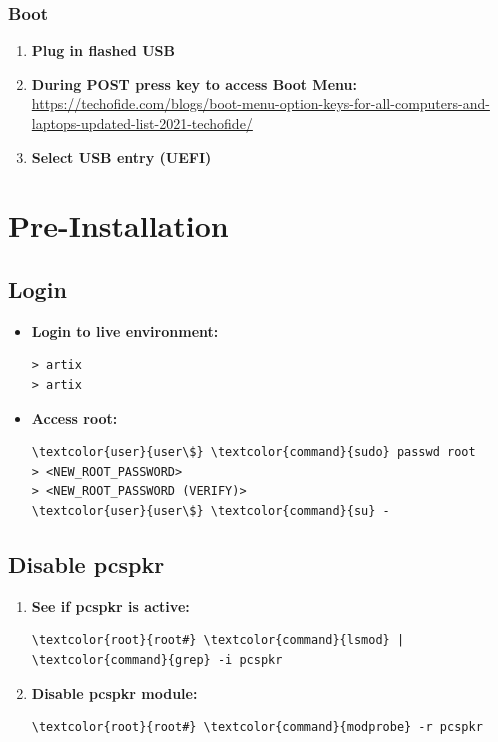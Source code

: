 \documentclass[10pt, a4paper, onecolumn, oneside, titlepage, openany]{book}
\begin{document}
\subsection{Boot}
\begin{enumerate}
    \item \textbf{Plug in flashed USB}
    \item \textbf{During POST press key to access Boot Menu:}
\newline \href{https://techofide.com/blogs/boot-menu-option-keys-for-all-computers-and-laptops-updated-list-2021-techofide/}{https://techofide.com/blogs/boot-menu-option-keys-for-all-computers-and-laptops-updated-list-2021-techofide/}
    \item \textbf{Select USB entry (UEFI)}
\end{enumerate}


\chapter{Pre-Installation}
\section{Login}
\begin{itemize}
    \item \textbf{Login to live environment:}
\begin{Verbatim}[commandchars=\\\{\}]
> artix
> artix
\end{Verbatim}
    \item \textbf{Access root:}
\begin{Verbatim}[commandchars=\\\{\}]
\textcolor{user}{user\$} \textcolor{command}{sudo} passwd root
> <NEW_ROOT_PASSWORD>
> <NEW_ROOT_PASSWORD (VERIFY)>
\textcolor{user}{user\$} \textcolor{command}{su} -
\end{Verbatim}
\end{itemize}

\section{Disable pcspkr}
\begin{enumerate}
    \item \textbf{See if pcspkr is active:}
\begin{Verbatim}[commandchars=\\\{\}]
\textcolor{root}{root#} \textcolor{command}{lsmod} | \textcolor{command}{grep} -i pcspkr
\end{Verbatim}
    \item \textbf{Disable pcspkr module:}
\begin{Verbatim}[commandchars=\\\{\}]
\textcolor{root}{root#} \textcolor{command}{modprobe} -r pcspkr
\end{Verbatim}
\end{enumerate}
\end{document}

